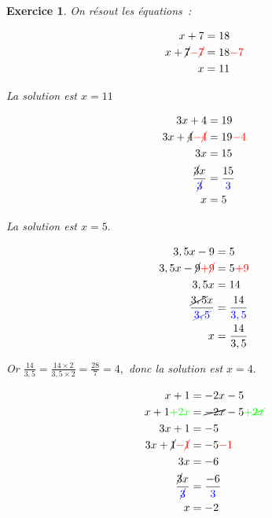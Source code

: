 \documentclass[10pt]{article}
\newtheorem{exo}{Exercice}
\begin{document}
\begin{exo}


On résout les équations~:

\setlength{\columnseprule}{1pt}
\begin{multicols}{5}
\begin{align*}
x+7&=18\\
x+\cancel{7}\textcolor{red}{-\cancel{7}}&=18\textcolor{red}{-7}\\
x&=11
\end{align*}

La solution est $x=11$

\columnbreak

\begin{align*}
3x+4&=19\\
3x+\cancel{4}\textcolor{red}{-\cancel{4}}&=19\textcolor{red}{-4}\\
3x&=15\\
\frac{\cancel{3}x}{\textcolor{blue}{\cancel{3}}}&=\frac{15}{\textcolor{blue}{3}}\\
x&=5
\end{align*}

La solution est $x=5.$

\columnbreak

\begin{align*}
3,5x-9&=5\\
3,5x-\cancel{9}\textcolor{red}{+\cancel{9}}&=5\textcolor{red}{+9}\\
3,5x&=14\\
\frac{\cancel{3,5}x}{\textcolor{blue}{\cancel{3,5}}}&=\frac{14}{\textcolor{blue}{3,5}}\\
x&=\frac{14}{3,5}
\end{align*}

Or $\frac{14}{3,5}=\frac{14\times 2}{3,5\times 2}=\frac{28}{7}=4,$ donc la solution est $x=4.$

 
 \columnbreak
 
 \begin{align*}
x+1&=-2x-5\\
x+1\textcolor{green}{+2x}&=\cancel{-2x}-5\textcolor{green}{+\cancel{2x}}\\
3x+1&=-5\\
3x+\cancel{1}\textcolor{red}{-\cancel{1}}&=-5\textcolor{red}{-{1}}\\
3x&=-6\\
\frac{\cancel{3}x}{\textcolor{blue}{\cancel{3}}}&=\frac{-6}{\textcolor{blue}{3}}\\
x&=-2
\end{align*}


\end{multicols}
\end{exo}
\end{document}

